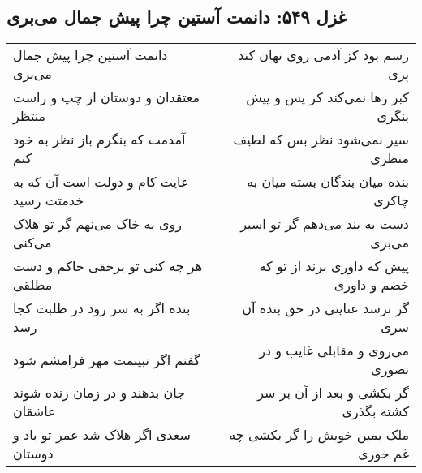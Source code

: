 \begin{center}
\section*{غزل ۵۴۹: دانمت آستین چرا پیش جمال می‌بری}
\label{sec:549}
\begin{longtable}{l p{0.5cm} r}
دانمت آستین چرا پیش جمال می‌بری
&&
رسم بود کز آدمی روی نهان کند پری
\\
معتقدان و دوستان از چپ و راست منتظر
&&
کبر رها نمی‌کند کز پس و پیش بنگری
\\
آمدمت که بنگرم باز نظر به خود کنم
&&
سیر نمی‌شود نظر بس که لطیف منظری
\\
غایت کام و دولت است آن که به خدمتت رسید
&&
بنده میان بندگان بسته میان به چاکری
\\
روی به خاک می‌نهم گر تو هلاک می‌کنی
&&
دست به بند می‌دهم گر تو اسیر می‌بری
\\
هر چه کنی تو برحقی حاکم و دست مطلقی
&&
پیش که داوری برند از تو که خصم و داوری
\\
بنده اگر به سر رود در طلبت کجا رسد
&&
گر نرسد عنایتی در حق بنده آن سری
\\
گفتم اگر نبینمت مهر فرامشم شود
&&
می‌روی و مقابلی غایب و در تصوری
\\
جان بدهند و در زمان زنده شوند عاشقان
&&
گر بکشی و بعد از آن بر سر کشته بگذری
\\
سعدی اگر هلاک شد عمر تو باد و دوستان
&&
ملک یمین خویش را گر بکشی چه غم خوری
\\
\end{longtable}
\end{center}
